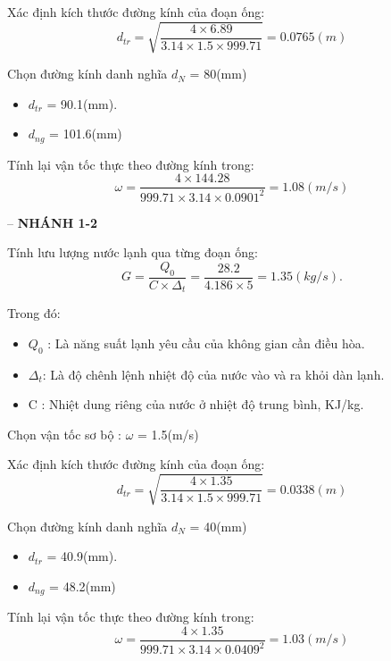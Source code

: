 Xác định kích thước đường kính của đoạn ống:
\begin{equation*}
	d_{tr} = \sqrt{\dfrac{4 \times 6.89}{3.14 \times 1.5 \times 999.71}} = 0.0765(m)
\end{equation*}

Chọn đường kính danh nghĩa $d_{N}$ = 80(mm)
\begin{itemize}
	\item $d_{tr}$ = 90.1(mm).
	\item $d_{ng}$ = 101.6(mm)
\end{itemize}

Tính lại vận tốc thực theo đường kính trong:
\begin{equation*}
	\omega = \dfrac{4 \times 144.28 }{999.71 \times 3.14 \times 0.0901^{2}} = 1.08(m/s)
\end{equation*}

-- \textbf{NHÁNH 1-2}

Tính lưu lượng nước lạnh qua từng đoạn ống:
\begin{equation*}
	G = \dfrac{Q_{0}}{C \times \Delta_{t}} =\dfrac{28.2}{4.186 \times 5} = 1.35(kg/s).
\end{equation*}

Trong đó:
\begin{itemize}
	\item $Q_{0}$ : Là năng suất lạnh yêu cầu của không gian cần điều hòa.
	\item $\Delta_{t}$: Là độ chênh lệnh nhiệt độ của nước vào và ra khỏi dàn lạnh.
	\item C : Nhiệt dung riêng của nước ở nhiệt độ trung bình, KJ/kg.
\end{itemize}

Chọn vận tốc sơ bộ : $\omega$ = 1.5(m/s)

Xác định kích thước đường kính của đoạn ống:
\begin{equation*}
	d_{tr} = \sqrt{\dfrac{4 \times 1.35}{3.14 \times 1.5 \times 999.71}} = 0.0338(m)
\end{equation*}

Chọn đường kính danh nghĩa $d_{N}$ = 40(mm)
\begin{itemize}
	\item $d_{tr}$ = 40.9(mm).
	\item $d_{ng}$ = 48.2(mm)
\end{itemize}

Tính lại vận tốc thực theo đường kính trong:
\begin{equation*}
	\omega = \dfrac{4 \times 1.35 }{999.71 \times 3.14 \times 0.0409^{2}} = 1.03(m/s)
\end{equation*}

